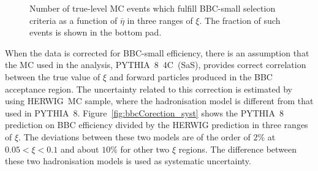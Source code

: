 \begin{figure}[h!]
\begin{subfigure}{.45\textwidth}
	\end{subfigure}
	\begin{minipage}{.45\textwidth}
		\caption{Number of true-level MC events which fulfill BBC-small selection criteria  as a function of $\bar{\eta}$ in three ranges of $\xi$. The fraction of such events is shown in the bottom pad.}
		\label{fig:bbcCorection_eta}
	\end{minipage}
	
\end{figure}

When the data is corrected for BBC-small efficiency, there is an assumption that the MC used in the analysis, PYTHIA~8~4C~(SaS), provides correct correlation between the true value of $\xi$ and forward particles produced in the BBC acceptance region.  The uncertainty related to this correction is  estimated by using HERWIG~MC sample, where the hadronisation model is different from that used in PYTHIA~8. Figure~\ref{fig:bbcCorection_syst} shows the PYTHIA~8  prediction on BBC efficiency  divided by the HERWIG prediction in three ranges of $\xi$. The deviations between these two models are of the order of $2\%$ at $0.05<\xi<0.1$ and about $10\%$ for  other two $\xi$ regions. The difference between these two hadronisation models is used as systematic uncertainty.

